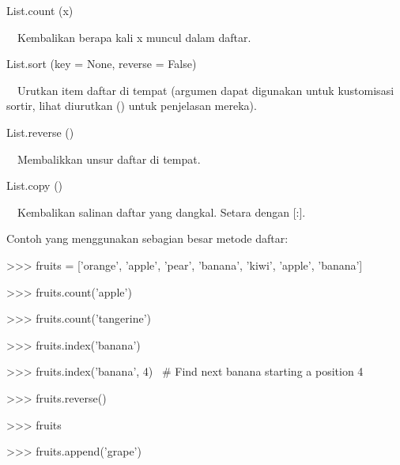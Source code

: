 \documentclass[a4paper,12pt]{report}
\begin{document}
\vspace{12pt}
\noindent 
List.count (x) \par
\vspace{12pt}
\noindent 
 $  $ $  $ $  $ $  $Kembalikan berapa kali x muncul dalam daftar. \par
\vspace{12pt}
\noindent 
List.sort (key = None, reverse = False) \par
\vspace{12pt}
\noindent 
 $  $ $  $ $  $ $  $Urutkan item daftar di tempat (argumen dapat digunakan untuk kustomisasi sortir, lihat diurutkan () untuk penjelasan mereka). \par
\vspace{12pt}
\noindent 
List.reverse () \par
\vspace{12pt}
\noindent 
 $  $ $  $ $  $ $  $Membalikkan unsur daftar di tempat. \par
\vspace{12pt}
\noindent 
List.copy () \par
\vspace{12pt}
\noindent 
 $  $ $  $ $  $ $  $Kembalikan salinan daftar yang dangkal. Setara dengan [:]. \par
\vspace{12pt}
\noindent 
Contoh yang menggunakan sebagian besar metode daftar: \par
\vspace{14pt}
\noindent 
>>> fruits = ['orange', 'apple', 'pear', 'banana', 'kiwi', 'apple', 'banana'] \par
\noindent 
>>> fruits.count('apple') \par
{} \par
\noindent 
>>> fruits.count('tangerine') \par
{} \par
\noindent 
>>> fruits.index('banana') \par
{} \par
\noindent 
>>> fruits.index('banana', 4)~  $  \#  $ Find next banana starting a position 4 \par
{} \par
\noindent 
>>> fruits.reverse() \par
\noindent 
>>> fruits \par
{} \par
\noindent 
>>> fruits.append('grape') \par
\end{document}
